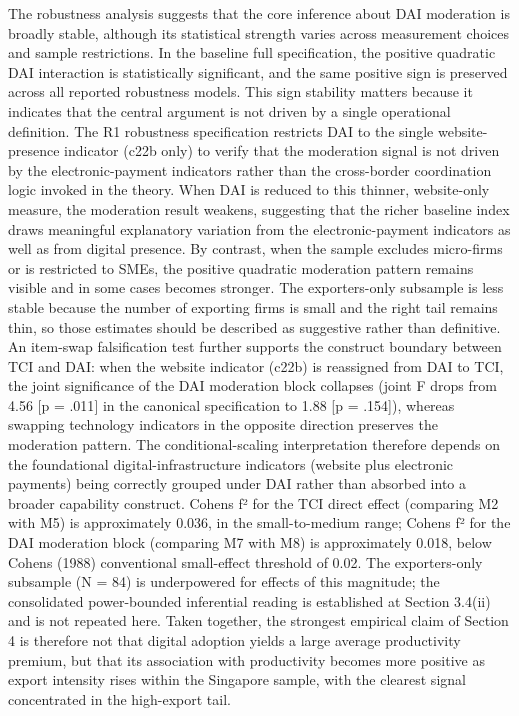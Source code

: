 \documentclass[12pt,a4paper]{article}
\begin{document}
The robustness analysis suggests that the core inference about DAI
moderation is broadly stable, although its statistical strength varies
across measurement choices and sample restrictions. In the baseline full
specification, the positive quadratic DAI interaction is statistically
significant, and the same positive sign is preserved across all reported
robustness models. This sign stability matters because it indicates that
the central argument is not driven by a single operational definition.
The R1 robustness specification restricts DAI to the single
website-presence indicator (c22b only) to verify that the moderation
signal is not driven by the electronic-payment indicators rather than
the cross-border coordination logic invoked in the theory. When DAI is
reduced to this thinner, website-only measure, the moderation result
weakens, suggesting that the richer baseline index draws meaningful
explanatory variation from the electronic-payment indicators as well as
from digital presence. By contrast, when the sample excludes micro-firms
or is restricted to SMEs, the positive quadratic moderation pattern
remains visible and in some cases becomes stronger. The exporters-only
subsample is less stable because the number of exporting firms is small
and the right tail remains thin, so those estimates should be described
as suggestive rather than definitive. An item-swap falsification test
further supports the construct boundary between TCI and DAI: when the
website indicator (c22b) is reassigned from DAI to TCI, the joint
significance of the DAI moderation block collapses (joint F drops from
4.56 {[}p = .011{]} in the canonical specification to 1.88 {[}p =
.154{]}), whereas swapping technology indicators in the opposite
direction preserves the moderation pattern. The conditional-scaling
interpretation therefore depends on the foundational
digital-infrastructure indicators (website plus electronic payments)
being correctly grouped under DAI rather than absorbed into a broader
capability construct. Cohen\textquotesingle s f² for the TCI direct
effect (comparing M2 with M5) is approximately 0.036, in the
small-to-medium range; Cohen\textquotesingle s f² for the DAI moderation
block (comparing M7 with M8) is approximately 0.018, below
Cohen\textquotesingle s (1988) conventional small-effect threshold of
0.02. The exporters-only subsample (N = 84) is underpowered for effects
of this magnitude; the consolidated power-bounded inferential reading is
established at Section 3.4(ii) and is not repeated here. Taken together,
the strongest empirical claim of Section 4 is therefore not that digital
adoption yields a large average productivity premium, but that its
association with productivity becomes more positive as export intensity
rises within the Singapore sample, with the clearest signal concentrated
in the high-export tail.
\end{document}
